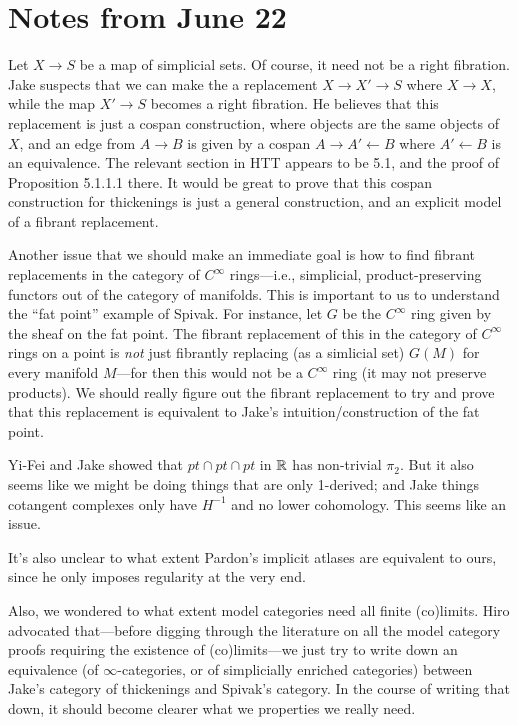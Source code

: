 

\section{Notes from June 22}

Let $X \to S$ be a map of simplicial sets. Of course, it need not be a right fibration. Jake suspects that we can make the a replacement $X \to X' \to S$ where $X \to X$, while the map $X' \to S$ becomes a right fibration. He believes that this replacement is just a cospan construction, where objects are the same objects of $X$, and an edge from $A \to B$ is given by a cospan $A \to A' \leftarrow B$ where $A' \leftarrow B$ is an equivalence. The relevant section in HTT appears to be 5.1, and the proof of Proposition 5.1.1.1 there. It would be great to prove that this cospan construction for thickenings is just a general construction, and an explicit model of a fibrant replacement.

Another issue that we should make an immediate goal is how to find fibrant replacements in the category of $C^\infty$ rings---i.e., simplicial, product-preserving functors out of the category of manifolds. This is important to us to understand the ``fat point'' example of Spivak. For instance, let $G$ be the $C^\infty$ ring given by the sheaf on the fat point. The fibrant replacement of this in the category of $C^\infty$ rings on a point is {\em not} just fibrantly replacing (as a simlicial set) $G(M)$ for every manifold $M$---for then this would not be a $C^\infty$ ring (it may not preserve products). We should really figure out the fibrant replacement to try and prove that this replacement is equivalent to Jake's intuition/construction of the fat point.

Yi-Fei and Jake showed that $pt \cap pt \cap pt$ in $\mathbb R$ has non-trivial $\pi_2$. But it also seems like we might be doing things that are only 1-derived; and Jake things cotangent complexes only have $H^{-1}$ and no lower cohomology. This seems like an issue. 

It's also unclear to what extent Pardon's implicit atlases are equivalent to ours, since he only imposes regularity at the very end.

Also, we wondered to what extent model categories need all finite (co)limits. Hiro advocated that---before digging through the literature on all the model category proofs requiring the existence of (co)limits---we just try to write down an equivalence (of $\infty$-categories, or of simplicially enriched categories) between Jake's category of thickenings and Spivak's category. In the course of writing that down, it should become clearer what we properties we really need.
